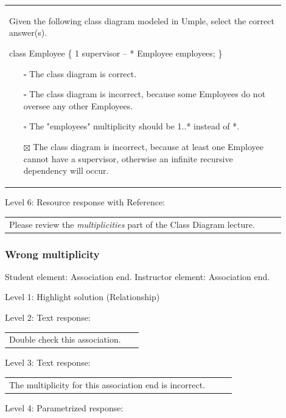 \begin{tabular}{|p{0.9\linewidth}}

Given the following class diagram modeled in Umple, select the correct answer(s).

class Employee \{ 1 supervisor -- * Employee employees; \}

\begin{itemize}
    \item[$\square$] The class diagram is correct.
    \item[$\square$] The class diagram is incorrect, because some Employees do not oversee any other Employees.
    \item[$\square$] The "employees" multiplicity should be 1..* instead of *.
    \item[$\boxtimes$] The class diagram is incorrect, because at least one Employee cannot have a supervisor, otherwise an infinite recursive dependency will occur.
\end{itemize}

\end{tabular} \medskip

\noindent Level 6: Resource response with Reference: \medskip

\begin{tabular}{|p{0.9\linewidth}}
Please review the \textit{multiplicities} part of the Class Diagram lecture.
\end{tabular} \medskip


\subsubsection{Wrong multiplicity}

Student element: Association end. Instructor element: Association end. \medskip

\noindent Level 1: Highlight solution (Relationship) \medskip

\noindent Level 2: Text response: \medskip

\begin{tabular}{|p{0.9\linewidth}}
Double check this association.
\end{tabular} \medskip

\noindent Level 3: Text response: \medskip

\begin{tabular}{|p{0.9\linewidth}}
The multiplicity for this association end is incorrect.
\end{tabular} \medskip

\noindent Level 4: Parametrized response: \medskip

